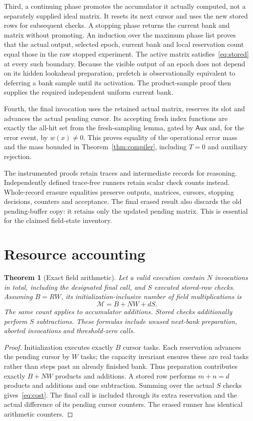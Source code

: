 \documentclass[11pt,letterpaper]{article}
\newtheorem{theorem}{Theorem}[section]
\theoremstyle{definition}
\newcommand{\Aux}{\mathsf{Aux}}
\begin{document}
Third, a continuing phase promotes the accumulator it actually computed, not a separately supplied ideal matrix. It resets its next cursor and uses the new stored rows for subsequent checks. A stopping phase returns the current bank and matrix without promoting. An induction over the maximum phase list proves that the actual output, selected epoch, current bank and local reservation count equal those in the raw stopped experiment. The active matrix satisfies~\eqref{eq:stored} at every such boundary. Because the visible output of an epoch does not depend on its hidden lookahead preparation, prefetch is observationally equivalent to deferring a bank sample until its activation. The product-sample proof then supplies the required independent uniform current bank.

Fourth, the final invocation uses the retained actual matrix, reserves its slot and advances the actual pending cursor. Its accepting fresh index functions are exactly the all-hit set from the fresh-sampling lemma, gated by $\Aux$ and, for the error event, by $w(x)\ne0$. This proves equality of the operational error mass and the mass bounded in Theorem~\ref{thm:compiler}, including $T=0$ and auxiliary rejection.

The instrumented proofs retain traces and intermediate records for reasoning. Independently defined trace-free runners retain scalar check counts instead. Whole-record erasure equalities preserve outputs, matrices, cursors, stopping decisions, counters and acceptance. The final erased result also discards the old pending-buffer copy: it retains only the updated pending matrix. This is essential for the claimed field-state inventory.

\section{Resource accounting}
\label{sec:resources}
\begin{theorem}[Exact field arithmetic]
\label{thm:cost}
Let a valid execution contain $N$ invocations in total, including the designated final call, and $S$ executed stored-row checks. Assuming $B=RW$, its initialization-inclusive number of field multiplications is
\begin{equation}
 \mathcal M=B+NW+dS.\label{eq:cost}
\end{equation}
The same count applies to accumulator additions. Stored checks additionally perform $S$ subtractions. These formulas include unused next-bank preparation, aborted invocations and threshold-zero calls.
\end{theorem}
\begin{proof}
Initialization executes exactly $B$ cursor tasks. Each reservation advances the pending cursor by $W$ tasks; the capacity invariant ensures these are real tasks rather than steps past an already finished bank. Thus preparation contributes exactly $B+NW$ products and additions. A stored row performs $m+n=d$ products and additions and one subtraction. Summing over the actual $S$ checks gives~\eqref{eq:cost}. The final call is included through its extra reservation and the actual difference of its pending cursor counters. The erased runner has identical arithmetic counters.
\end{proof}
\end{document}
